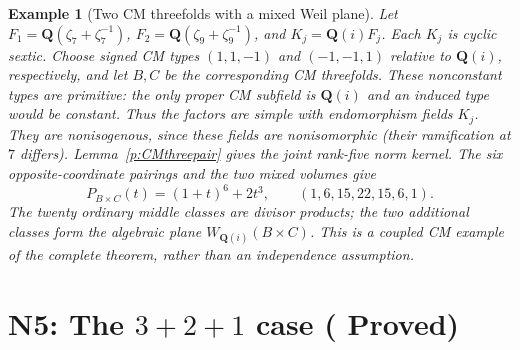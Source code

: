 \documentclass[11pt,reqno]{article}
\theoremstyle{emphasizedplain}
\DeclareRobustCommand{\provedstatus}{%
  \texorpdfstring{\textcolor{ProvedGreen}{\textbf{Proved}}}{Proved}}
\theoremstyle{emphasizeddefinition}
\newtheorem{example}[theorem]{Example}
\theoremstyle{emphasizeddefinition}
\newcommand{\Q}{\mathbf Q}
\begin{document}
\begin{example}[Two CM threefolds with a mixed Weil plane]
Let $F_1=\Q(\zeta_7+\zeta_7^{-1})$,
$F_2=\Q(\zeta_9+\zeta_9^{-1})$, and $K_j=\Q(i)F_j$.
Each $K_j$ is cyclic sextic. Choose signed CM types $(1,1,-1)$ and
$(-1,-1,1)$ relative to $\Q(i)$, respectively, and let $B,C$ be the
corresponding CM threefolds. These nonconstant types are primitive:
the only proper CM subfield is $\Q(i)$ and an induced type would be
constant. Thus the factors are simple with endomorphism fields $K_j$.
They are nonisogenous, since these fields are nonisomorphic (their
ramification at $7$ differs). Lemma~\ref{p:CMthreepair} gives the joint
rank-five norm kernel. The six opposite-coordinate pairings and the
two mixed volumes give
\[
 P_{B\times C}(t)=(1+t)^6+2t^3,
 \qquad (1,6,15,22,15,6,1).
\]
The twenty ordinary middle classes are divisor products; the two
additional classes form the algebraic plane $W_{\Q(i)}(B\times C)$.
This is a coupled CM example of the complete theorem, rather than
an independence assumption.
\end{example}
\section{N5: The \texorpdfstring{$3+2+1$}{3+2+1} case (\provedstatus)}\label{sec:N5}
\end{document}
